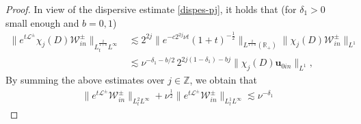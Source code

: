 \documentclass[11pt,reqno]{article}
\numberwithin{equation}{section}
\newcommand\R{{\mathbb R}}
\newcommand\Z{{\mathbb Z}}
\newcommand\W{{\mathcal W}}
\newcommand\uu{\bm{u}}
\let\f=\frac
\begin{document}
\begin{proof}
In view of the dispersive estimate \eqref{dispes-pj}, it holds that (for $\delta_1>0 $ small enough and $b=0,1$)
\begin{align*}
	\|e^{t\mathcal{L}^{\pm}} \chi_j(D)\W^{\pm}_{in}\|_{L^{\f{2}{1+b}}_tL^\infty}&\lesssim 2^{2j}\|e^{-c2^{2j}\nu t} (1+t)^{-\f12}\|_{L^\f{2}{1+b}(\R_{+})} \|\chi_j(D)\W^{\pm}_{in}\|_{L^{1}}\\
    &\lesssim \nu^{-\delta_1-b/2}\, 2^{2j(1-\delta_1)-bj}\|\chi_j(D)\uu_{0in}\|_{L^{1}},
\end{align*}
By summing the above estimates over $j\in\Z$, we  obtain that
\begin{align}\label{est-win-2}
	\|e^{t\mathcal{L}^{\pm}} \W^{\pm}_{in}\|_{L^2_tL^\infty}+ \nu^{\f12}\|e^{t\mathcal{L}^{\pm}} \W^{\pm}_{in}\|_{L^1_tL^\infty} \lesssim    \nu^{-\delta_1}

\end{align}
\end{proof}
\end{document}
